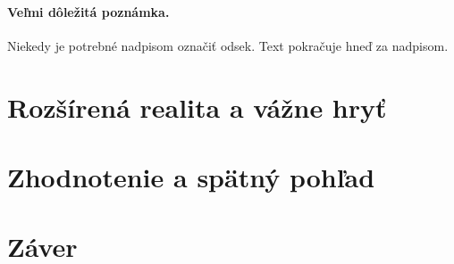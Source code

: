 \documentclass[10pt,twoside,slovak,a4paper]{article}
\begin{document}
\paragraph{Veľmi dôležitá poznámka.}
Niekedy je potrebné nadpisom označiť odsek. Text pokračuje hneď za nadpisom.



\section{Rozšírená realita a vážne hryť} \label{vz}




\section{Zhodnotenie a spätný pohľad} \label{konec}




\section{Záver} \label{zaver} %






\end{document}
